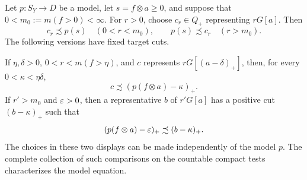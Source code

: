 \begin{proposition}\label{seq:sandwich}
Let \(p:S_Y\to D\) be a model, let \(s=f\otimes a\geq0\), and
suppose that \(0<m_0:=m(f>0)<\infty\). For \(r>0\), choose
\(c_r\in Q_+\) representing \(rG[a]\). Then
\begin{equation}\label{seq:uncut-sandwich}
 c_r\precsim p(s)\quad(0<r<m_0),
 \qquad
 p(s)\precsim c_r\quad(r>m_0).
\end{equation}
The following versions have fixed target cuts.

If \(\eta,\delta>0\), \(0<r<m(f>\eta)\), and \(c\) represents
\(rG[(a-\delta)_+]\), then, for every \(0<\kappa<\eta\delta\),
\begin{equation}\label{seq:lower-trimmed-sandwich}
 c\precsim(p(f\otimes a)-\kappa)_+.
\end{equation}
If \(r'>m_0\) and \(\varepsilon>0\), then a representative \(b\) of
\(r'G[a]\) has a positive cut \((b-\kappa)_+\) such that
\begin{equation}\label{seq:upper-trimmed-sandwich}
 (p(f\otimes a)-\varepsilon)_+\precsim(b-\kappa)_+.
\end{equation}
The choices in these two displays can be made independently of
the model \(p\). The complete collection of such comparisons on
the countable compact tests characterizes the model equation.
\end{proposition}

